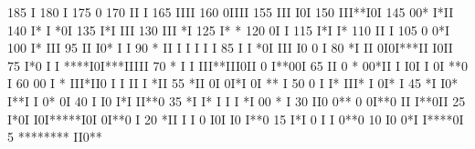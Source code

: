 \begin{Listing}
      185                                    I
      180                                    I
      175                                    0
      170                                   II I
      165                                   IIII
      160                                   0IIII
      155                                 III I0I
      150                                 III**I0I
      145                                 00* I*II
      140                                 I*  I *0I
      135                                I*I    III
      130                               III      *I
      125                               I*        *
      120                               0I        I
      115                              I*I        I*
      110                              II          I
      105                              0           0*I
      100                             I*           III
       95                             II           I0* I                                I
       90                             *             II I                        I     I I  I
       85                             I             I *0I                       III  I0 0  I
       80                            *I                II                       0I0I***II I0II
       75                                             I*0                  I I  ****I0I***IIIII
       70                           *                 I I                  III**III0II 0 I**00I
       65                           II                0 *                  00*II I I0I I 0I **0 I
       60                           00                I  *               III*II0    I  I II I *II
       55                          *II                   0I              0I*I 0I               **   I
       50                          0 I                   I*            III*   I                0I*  I
       45                         *I                     I0*           I**I                    I 0* 0I
       40                          I                      I0          I*I                        II**0
       35                        *I                        I* I I I   *I                          00 *  I
       30                       II0                         0** 0 0I**0                           II I**0II
       25                      I*0I                         I0I*****I0I                               0I**0 I
       20                      *II                           I I 0 I0I                                I0 I**0
       15                    I*I                               0 I  I                                      0**0
       10                I0 0*I                                                                              I****0I
        5            ********                                                                                  II0**
 

\end{Listing}
